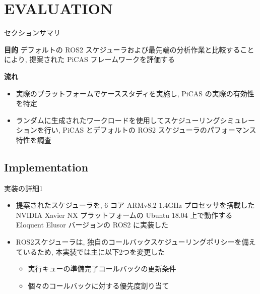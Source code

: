 
\section{EVALUATION}
\label{sec: evaluation}

\begin{frame}{セクションサマリ}
    \begin{itembox}[l]{\textbf{目的}}
        デフォルトの ROS2 スケジューラおよび最先端の分析作業と比較することにより, 提案された PiCAS フレームワークを評価する
    \end{itembox}
    \begin{itembox}[l]{\textbf{流れ}}
        \begin{itemize}
            \item 実際のプラットフォームでケーススタディを実施し, PiCAS の実際の有効性を特定
            \item ランダムに生成されたワークロードを使用してスケジューリングシミュレーションを行い, PiCAS とデフォルトの ROS2 スケジューラのパフォーマンス特性を調査
        \end{itemize}
    \end{itembox}
\end{frame}


\subsection{Implementation}
\label{ssec: implementation}

\begin{frame}{実装の詳細1}
    \begin{itemize}
        \item 提案されたスケジューラを, 6 コア ARMv8.2 $1.4 \mathrm{GHz}$ プロセッサを搭載した NVIDIA Xavier NX プラットフォームの Ubuntu $18.04$ 上で動作する Eloquent Elusor バージョンの ROS2 に実装した
        \item ROS2スケジューラは, 独自のコールバックスケジューリングポリシーを備えているため, 本実装では主に以下2つを変更した
              \begin{itemize}
                  \item 実行キューの準備完了コールバックの更新条件
                  \item 個々のコールバックに対する優先度割り当て
              \end{itemize}
    \end{itemize}
\end{frame}

